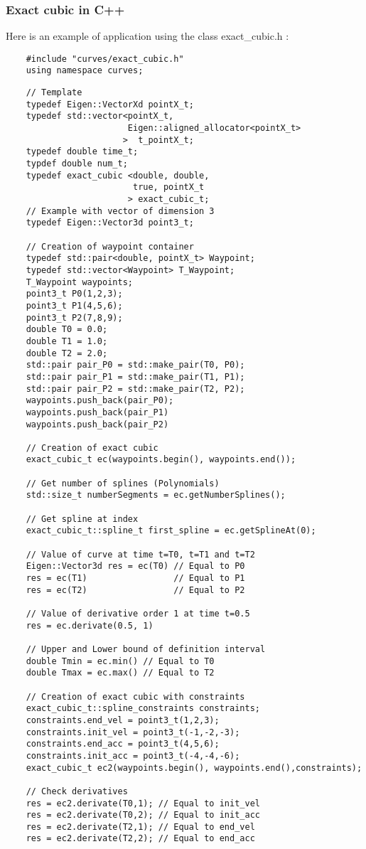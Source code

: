 \documentclass{article}
\begin{document}
    \subsubsection{Exact cubic in C++}
    Here is an example of application using the class exact\_cubic.h :

    \begin{lstlisting}
    #include "curves/exact_cubic.h"
    using namespace curves;
    \end{lstlisting}
    \begin{lstlisting}
    // Template
    typedef Eigen::VectorXd pointX_t;
    typedef std::vector<pointX_t,
                        Eigen::aligned_allocator<pointX_t>
                       >  t_pointX_t;
    typedef double time_t;
    typdef double num_t;
    typedef exact_cubic <double, double,
                         true, pointX_t
                        > exact_cubic_t;
    // Example with vector of dimension 3
    typedef Eigen::Vector3d point3_t;

    // Creation of waypoint container
    typedef std::pair<double, pointX_t> Waypoint;
    typedef std::vector<Waypoint> T_Waypoint;
    T_Waypoint waypoints;
    point3_t P0(1,2,3);
    point3_t P1(4,5,6);
    point3_t P2(7,8,9);
    double T0 = 0.0;
    double T1 = 1.0;
    double T2 = 2.0;
    std::pair pair_P0 = std::make_pair(T0, P0);
    std::pair pair_P1 = std::make_pair(T1, P1);
    std::pair pair_P2 = std::make_pair(T2, P2);
    waypoints.push_back(pair_P0);
    waypoints.push_back(pair_P1)
    waypoints.push_back(pair_P2)

    // Creation of exact cubic
    exact_cubic_t ec(waypoints.begin(), waypoints.end());

    // Get number of splines (Polynomials)
    std::size_t numberSegments = ec.getNumberSplines();

    // Get spline at index
    exact_cubic_t::spline_t first_spline = ec.getSplineAt(0);

    // Value of curve at time t=T0, t=T1 and t=T2
    Eigen::Vector3d res = ec(T0) // Equal to P0
    res = ec(T1)                 // Equal to P1
    res = ec(T2)                 // Equal to P2

    // Value of derivative order 1 at time t=0.5
    res = ec.derivate(0.5, 1)

    // Upper and Lower bound of definition interval
    double Tmin = ec.min() // Equal to T0
    double Tmax = ec.max() // Equal to T2

    // Creation of exact cubic with constraints
    exact_cubic_t::spline_constraints constraints;
    constraints.end_vel = point3_t(1,2,3);
    constraints.init_vel = point3_t(-1,-2,-3);
    constraints.end_acc = point3_t(4,5,6);
    constraints.init_acc = point3_t(-4,-4,-6);
    exact_cubic_t ec2(waypoints.begin(), waypoints.end(),constraints);

    // Check derivatives
    res = ec2.derivate(T0,1); // Equal to init_vel
    res = ec2.derivate(T0,2); // Equal to init_acc
    res = ec2.derivate(T2,1); // Equal to end_vel
    res = ec2.derivate(T2,2); // Equal to end_acc
    \end{lstlisting}
\end{document}
